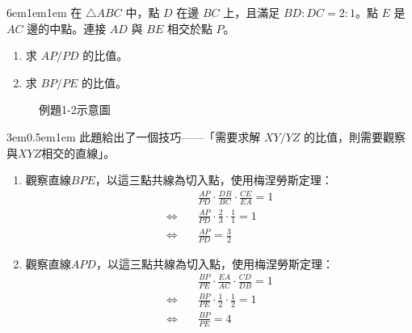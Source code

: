 \documentclass[12pt]{article}
\newif\ifshow
\begin{document}
\begin{mybox}[例題\thesection-2]{6em}{1em}{1em}
    在 $\triangle ABC$ 中，點 $D$ 在邊 $BC$ 上，且滿足 $BD:DC = 2:1$。點 $E$ 是 $AC$ 邊的中點。連接 $AD$ 與 $BE$ 相交於點 $P$。
    \begin{enumerate}[label=(\roman*)]
        \item 求 $AP/PD$ 的比值。
        \item 求 $BP/PE$ 的比值。
    \end{enumerate}
    \begin{figure}[H]
        \centering 
        \caption{例題1-2示意圖}
        \label{fig:coline_s1-4}
    \end{figure}
\end{mybox}
\ifshow
\begin{mybox}[解]{3em}{0.5em}{1em}
此題給出了一個技巧——「需要求解 $XY/YZ$ 的比值，則需要觀察與$XYZ$相交的直線」。
\begin{enumerate}[label=(\roman*)]
    \item 觀察直線$BPE$，以這三點共線為切入點，使用梅涅勞斯定理：
    \begin{align*}
        &\frac{AP}{PD}\cdot\frac{DB}{BC}\cdot\frac{CE}{EA}=1\\
        \Leftrightarrow\quad&\frac{AP}{PD}\cdot\frac{2}{3}\cdot\frac{1}{1}=1\\
        \Leftrightarrow\quad&\frac{AP}{PD}=\frac{3}{2}
    \end{align*}
    \item 觀察直線$APD$，以這三點共線為切入點，使用梅涅勞斯定理：
    \begin{align*}
        &\frac{BP}{PE}\cdot\frac{EA}{AC}\cdot\frac{CD}{DB}=1\\
        \Leftrightarrow\quad&\frac{BP}{PE}\cdot\frac{1}{2}\cdot\frac{1}{2}=1\\
        \Leftrightarrow\quad&\frac{BP}{PE}=4
    \end{align*}
\end{enumerate}
\end{mybox}
\end{document}
